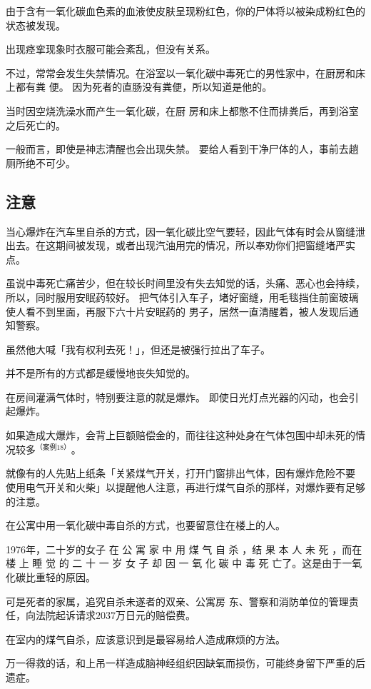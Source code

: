 \documentclass[UTF8]{ctexart}
\begin{document}
由于含有一氧化碳血色素的血液使皮肤呈现粉红色，你的尸体将以被染成粉红色的状态被发现。

出现痉挛现象时衣服可能会紊乱，但没有关系。

不过，常常会发生失禁情况。在浴室以一氧化碳中毒死亡的男性家中，在厨房和床上都有粪 便。
因为死者的直肠没有粪便，所以知道是他的。

当时因空烧洗澡水而产生一氧化碳，在厨 房和床上都憋不住而排粪后，再到浴室之后死亡的。

一般而言，即使是神志清醒也会出现失禁。
要给人看到干净尸体的人，事前去趟厕所绝不可少。

\subsection{注意}

当心爆炸在汽车里自杀的方式，因一氧化碳比空气要轻，因此气体有时会从窗缝泄出去。在这期间被发现，或者出现汽油用完的情况，所以奉劝你们把窗缝堵严实点。

虽说中毒死亡痛苦少，但在较长时间里没有失去知觉的话，头痛、恶心也会持续，所以，同时服用安眠药较好。
把气体引入车子，堵好窗缝，用毛毯挡住前窗玻璃使人看不到里面，再服下六十片安眠药的 男子，居然一直清醒着，被人发现后通知警察。

虽然他大喊「我有权利去死！」，但还是被强行拉出了车子。

并不是所有的方式都是缓慢地丧失知觉的。 

在房间灌满气体时，特别要注意的就是爆炸。
即使日光灯点光器的闪动，也会引起爆炸。

如果造成大爆炸，会背上巨额赔偿金的，而往往这种处身在气体包围中却未死的情况较多$^{（案例 18）}$。

就像有的人先贴上纸条「关紧煤气开关，打开门窗排出气体，因有爆炸危险不要 使用电气开关和火柴」以提醒他人注意，再进行煤气自杀的那样，对爆炸要有足够的注意。

在公寓中用一氧化碳中毒自杀的方式，也要留意住在楼上的人。

1976年，二十岁的女子 在 公 寓 家 中 用 煤 气 自 杀 ，结 果 本 人 未 死 ，而在 楼 上 睡 觉 的 二 十 一 岁 女 子 却 因 一 氧 化 碳 中 毒 死 亡了。这是由于一氧化碳比重轻的原因。

可是死者的家属，追究自杀未遂者的双亲、公寓房 东、警察和消防单位的管理责任，向法院起诉请求$2037$万日元的赔偿费。

在室内的煤气自杀，应该意识到是最容易给人造成麻烦的方法。

万一得救的话，和上吊一样造成脑神经组织因缺氧而损伤，可能终身留下严重的后遗症。
\end{document}
